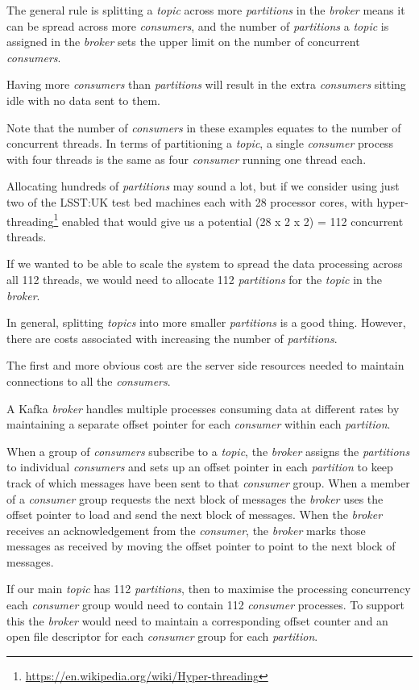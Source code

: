 \documentclass{article}
\newcommand{\kftopic} {\textit{topic}\xspace}
\newcommand{\kftopics} {\textit{topics}\xspace}
\newcommand{\kfbroker} {\textit{broker}\xspace}
\newcommand{\kfconsumer} {\textit{consumer}\xspace}
\newcommand{\kfconsumers} {\textit{consumers}\xspace}
\newcommand{\kfpartition} {\textit{partition}\xspace}
\newcommand{\kfpartitions} {\textit{partitions}\xspace}
\newcommand{\footurl}[1] {\footnote{\url{#1}}}
\begin{document}
The general rule is splitting a \kftopic across more \kfpartitions in the \kfbroker means it can be spread across more \kfconsumers, and the number of \kfpartitions a \kftopic is assigned in the \kfbroker sets the upper limit on the number of concurrent \kfconsumers.

Having more \kfconsumers than \kfpartitions will result in the extra \kfconsumers sitting idle with no data sent to them.

Note that the number of \kfconsumers in these examples equates to the number of concurrent threads. In terms of partitioning a \kftopic, a single \kfconsumer process with four threads is the same as
four \kfconsumer running one thread each.

Allocating hundreds of \kfpartitions may sound a lot, but if we consider using just two of the LSST:UK test bed machines each with 28 processor cores, with hyper-threading\footurl{https://en.wikipedia.org/wiki/Hyper-threading} enabled that would give us a potential (28 x 2 x 2) = 112 concurrent threads.

If we wanted to be able to scale the system to spread the data processing across all 112 threads, we would need to allocate 112 \kfpartitions for the \kftopic in the \kfbroker.

In general, splitting \kftopics into more smaller \kfpartitions is a good thing.
However, there are costs associated with increasing the number of \kfpartitions.

The first and more obvious cost are the server side resources needed to maintain connections to all the \kfconsumers.

A Kafka \kfbroker handles multiple processes consuming data at different rates by maintaining a separate offset pointer for each \kfconsumer within each \kfpartition.

When a group of \kfconsumers subscribe to a \kftopic, the \kfbroker assigns the \kfpartitions to individual \kfconsumers and sets up an offset pointer in each \kfpartition to keep track of which messages have been sent to that \kfconsumer group.
When a member of a \kfconsumer group requests the next block of messages the \kfbroker uses the offset pointer to load and send the next block of messages.
When the \kfbroker receives an acknowledgement from the \kfconsumer, the \kfbroker marks those messages as received by moving the offset pointer to point to the next block of messages.

If our main \kftopic has 112 \kfpartitions, then to maximise the processing concurrency each \kfconsumer group would need to contain 112 \kfconsumer processes.
To support this the \kfbroker would need to maintain a corresponding offset counter and an open file descriptor for each \kfconsumer group for each \kfpartition.
\end{document}
